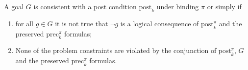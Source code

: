 \begin{defi}
A goal $G$ is consistent with a post condition $\mbox{post}_k$ under binding $\pi$ or simply  if
\begin{enumerate}
 \item for all $g\in G$ it is not true that $\neg g$ is a logical consequence of $\mbox{post}_k^{\pi}$ and the preserved $\mbox{prec}_k^{\pi}$ formulas;
 \item None of the problem constraints are violated by the conjunction of $\mbox{post}_k^{\pi}$, $G$ and the preserved $\mbox{prec}_k^{\pi}$ formulas.
\end{enumerate}
\cite{conf/ijcai/ChengI89}
\end{defi}